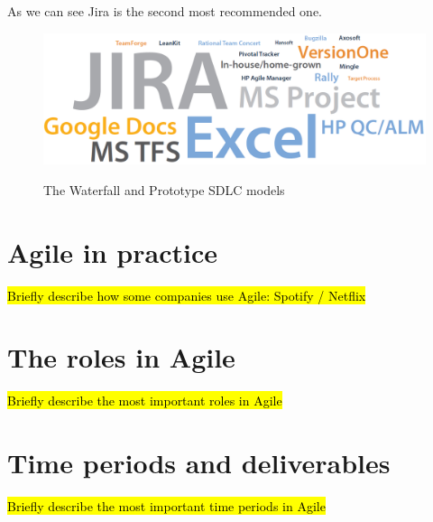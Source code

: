 	As we can see Jira is the second most recommended one.

	\begin{figure}[H]
		\centering
		\includegraphics[width=.8\textwidth]{resources/Untitled_4}\\
		\caption{The Waterfall and Prototype SDLC models}
	\end{figure}

\section{Agile in practice}
\hl{Briefly describe how some companies use Agile: Spotify / Netflix}






\section{The roles in Agile}
\hl{Briefly describe the most important roles in Agile}

\section{Time periods and deliverables}
\hl{Briefly describe the most important time periods in Agile}


